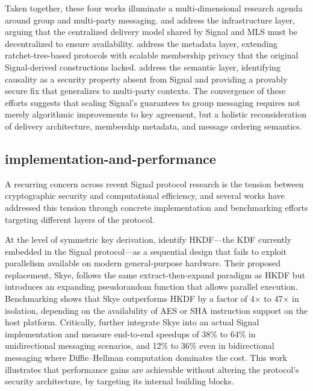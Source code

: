 Taken together, these four works illuminate a multi-dimensional research agenda around group and multi-party messaging. \textcite{paillat2024} and \textcite{paillat2025} address the infrastructure layer, arguing that the centralized delivery model shared by Signal and MLS must be decentralized to ensure availability. \textcite{emura2023} address the metadata layer, extending ratchet-tree-based protocols with scalable membership privacy that the original Signal-derived constructions lacked. \textcite{chen2024} address the semantic layer, identifying causality as a security property absent from Signal and providing a provably secure fix that generalizes to multi-party contexts. The convergence of these efforts suggests that scaling Signal's guarantees to group messaging requires not merely algorithmic improvements to key agreement, but a holistic reconsideration of delivery architecture, membership metadata, and message ordering semantics.

\subsection{implementation-and-performance}

A recurring concern across recent Signal protocol research is the tension between cryptographic security and computational efficiency, and several works have addressed this tension through concrete implementation and benchmarking efforts targeting different layers of the protocol.

At the level of symmetric key derivation, \textcite{bhati2024} identify HKDF—the KDF currently embedded in the Signal protocol—as a sequential design that fails to exploit parallelism available on modern general-purpose hardware. Their proposed replacement, Skye, follows the same extract-then-expand paradigm as HKDF but introduces an expanding pseudorandom function that allows parallel execution. Benchmarking shows that Skye outperforms HKDF by a factor of 4$\times$ to 47$\times$ in isolation, depending on the availability of AES or SHA instruction support on the host platform. Critically, \textcite{bhati2024} further integrate Skye into an actual Signal implementation and measure end-to-end speedups of 38\% to 64\% in unidirectional messaging scenarios, and 12\% to 36\% even in bidirectional messaging where Diffie–Hellman computation dominates the cost. This work illustrates that performance gains are achievable without altering the protocol's security architecture, by targeting its internal building blocks.

